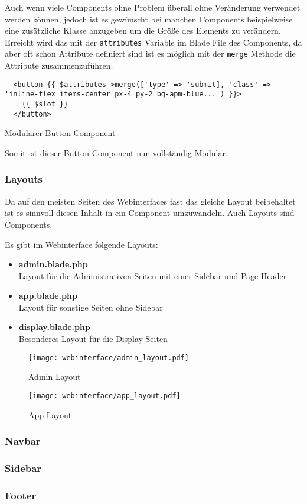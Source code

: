 Auch wenn viele Components ohne Problem überall ohne Veränderung verwendet
werden können, jedoch ist es gewünscht bei manchen Components beispielweise eine
zusätzliche Klasse anzugeben um die Größe des Elements zu verändern. Erreicht
wird das mit der \verb|attributes| Variable im Blade File des Components, da
aber oft schon Attribute definiert sind ist es möglich mit der \verb|merge|
Methode die Attribute zusammenzuführen.


\begin{listing}[H]
  \begin{verbatim}
  <button {{ $attributes->merge(['type' => 'submit], 'class' => 'inline-flex items-center px-4 py-2 bg-apm-blue...') }}>
    {{ $slot }}
  </button>
  \end{verbatim}
  \caption{Modularer Button Component}
\end{listing}

Somit ist dieser Button Component nun vollständig Modular.


\subsubsection{Layouts}

Da auf den meisten Seiten des Webinterfaces fast das gleiche Layout beibehaltet ist es sinnvoll diesen Inhalt in ein Component umzuwandeln. Auch Layouts
sind Components.

Es gibt im Webinterface folgende Layouts:

\begin{itemize}
  \item \textbf{admin.blade.php}\\
  Layout für die Administrativen Seiten mit einer Sidebar und Page Header
  \item \textbf{app.blade.php}\\
  Layout für sonstige Seiten ohne Sidebar
  \item \textbf{display.blade.php}\\
  Besonderes Layout für die Display Seiten
\end{itemize}

\begin{figure}[H]
  \centering
  \texttt{[image: webinterface/admin\_layout.pdf]}
  \caption{Admin Layout}
\end{figure}

\begin{figure}[H]
  \centering
  \texttt{[image: webinterface/app\_layout.pdf]}
  \caption{App Layout}
\end{figure}


\subsubsection{Navbar}


\subsubsection{Sidebar}


\subsubsection{Footer}

